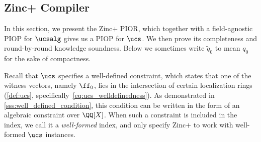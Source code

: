 \subsection{Zinc+ Compiler}
\label{sec:zincplus-ucs-pior}

In this section, we present the Zinc$+$ PIOR, which together with a field-agnostic PIOP for $\ucsalg$ gives us a PIOP for $\ucs$. We then prove its completeness and round-by-round knowledge soundness. Below we sometimes write $\tilde{q}_0$ to mean $q_0$ for the sake of compactness.

\label{rem:zincplus_welldefinedness_in_qpart}
Recall that $\ucs$ specifies a well-defined constraint, which states that one of the witness vectors, namely $\ff_0$, lies in the intersection of certain localization rings (\cref{def:ucs}, specifically~\cref{eq:ucs_welldefinedness}). As demonstrated in \cref{sss:well_defined_condition}, this condition can be written in the form of an algebraic constraint over $\QQ[X]$. When such a constraint is included in the index, we call it a \emph{well-formed} index, and only specify Zinc$+$ to work with well-formed $\ucs$ instances.

